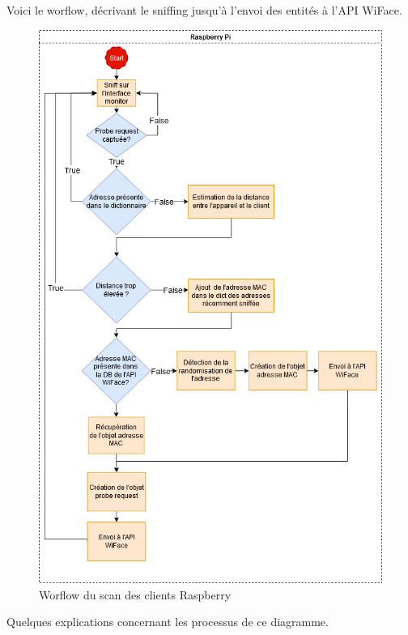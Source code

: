 Voici le worflow, décrivant le sniffing jusqu'à l'envoi 
des entités à l'API WiFace. 

\begin{figure}[H]
	\centering
	\includegraphics[width=12cm]{images/probe/flowchart_scan_probe.png}
    \caption{Worflow du scan des clients Raspberry}
	\label{fig:worflow-scan}
\end{figure}

Quelques explications concernant les processus de ce diagramme.

